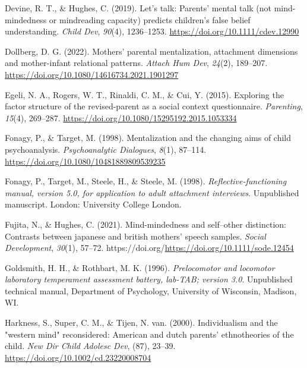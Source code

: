 \documentclass[
]{article}
\newlength{\cslhangindent}
\newlength{\cslentryspacingunit} %
\newenvironment{CSLReferences}[2] %
 {%
  \setlength{\parindent}{0pt}
  \ifodd #1
  \let\oldpar\par
  \def\par{\hangindent=\cslhangindent\oldpar}
  \fi
  \setlength{\parskip}{#2\cslentryspacingunit}
 }%
 {}
\begin{document}
\begin{CSLReferences}{1}{0}
\leavevmode{}%
Devine, R. T., \& Hughes, C. (2019). Let's talk: Parents' mental talk (not mind-mindedness or mindreading capacity) predicts children's false belief understanding. \emph{Child Dev}, \emph{90}(4), 1236--1253. \url{https://doi.org/10.1111/cdev.12990}

\leavevmode{}%
Dollberg, D. G. (2022). Mothers' parental mentalization, attachment dimensions and mother-infant relational patterns. \emph{Attach Hum Dev}, \emph{24}(2), 189--207. \url{https://doi.org/10.1080/14616734.2021.1901297}

\leavevmode{}%
Egeli, N. A., Rogers, W. T., Rinaldi, C. M., \& Cui, Y. (2015). Exploring the factor structure of the revised-parent as a social context questionnaire. \emph{Parenting}, \emph{15}(4), 269--287. \url{https://doi.org/10.1080/15295192.2015.1053334}

\leavevmode{}%
Fonagy, P., \& Target, M. (1998). Mentalization and the changing aims of child psychoanalysis. \emph{Psychoanalytic Dialogues}, \emph{8}(1), 87--114. \url{https://doi.org/10.1080/10481889809539235}

\leavevmode{}%
Fonagy, P., Target, M., Steele, H., \& Steele, M. (1998). \emph{Reflective-functioning manual, version 5.0, for application to adult attachment interviews}. Unpublished manuscript. London: University College London.

\leavevmode{}%
Fujita, N., \& Hughes, C. (2021). Mind-mindedness and self--other distinction: Contrasts between japanese and british mothers' speech samples. \emph{Social Development}, \emph{30}(1), 57--72. https://doi.org/\url{https://doi.org/10.1111/sode.12454}

\leavevmode{}%
Goldsmith, H. H., \& Rothbart, M. K. (1996). \emph{Prelocomotor and locomotor laboratory temperament assessment battery, lab-TAB; version 3.0}. Unpublished technical manual, Department of Psychology, University of Wisconsin, Madison, WI.

\leavevmode{}%
Harkness, S., Super, C. M., \& Tijen, N. van. (2000). Individualism and the "western mind" reconsidered: American and dutch parents' ethnotheories of the child. \emph{New Dir Child Adolesc Dev}, (87), 23--39. \url{https://doi.org/10.1002/cd.23220008704}


\end{CSLReferences}
\end{document}
